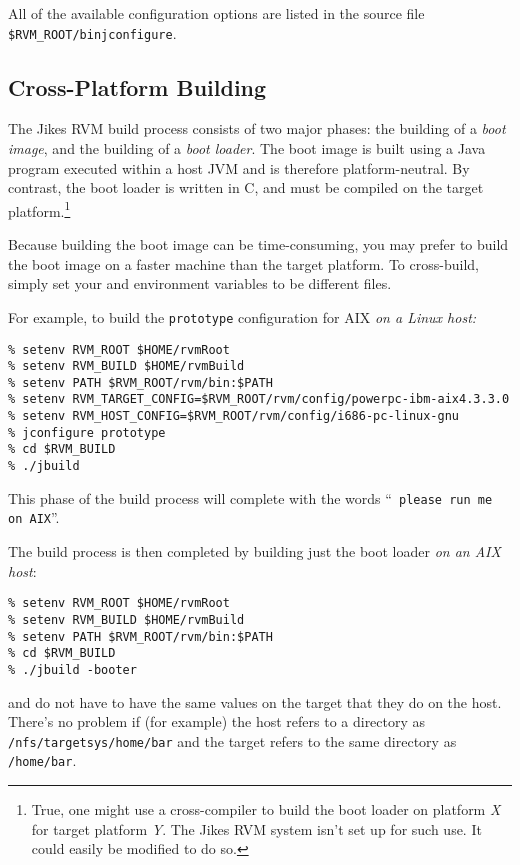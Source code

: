 All of the available configuration options are listed in the source
file \texttt{\$RVM\_ROOT\-/bin\/\-j\-con\-fi\-gure}.

\subsection{Cross-Platform Building}\label{cross-platform-building}

The Jikes\TMweb{} RVM build process consists of two major phases:
the building of a 
{\em boot image}, and the building of a {\em boot loader}.
The boot image is built using a Java\TMweb{} program executed within a host
JVM and is therefore platform-neutral.  By contrast, the boot loader
is written in C, and must be compiled on the target
platform.\footnote{True, one might use a cross-compiler to build the
  boot loader on platform \textit{X} for target platform \textit{Y}.
  The Jikes RVM system isn't set up for such use.  It could easily be
  modified to do so.}

Because building the boot image can be time-consuming,
you may prefer to build the boot image
on a faster machine than the target platform.  To cross-build, simply
set your 
 and  environment variables to
be different files.

For example, to build the \texttt{prototype} configuration for AIX\TMweb{} 
{\em on a Linux host:}
\begin{verbatim}
% setenv RVM_ROOT $HOME/rvmRoot
% setenv RVM_BUILD $HOME/rvmBuild
% setenv PATH $RVM_ROOT/rvm/bin:$PATH
% setenv RVM_TARGET_CONFIG=$RVM_ROOT/rvm/config/powerpc-ibm-aix4.3.3.0
% setenv RVM_HOST_CONFIG=$RVM_ROOT/rvm/config/i686-pc-linux-gnu
% jconfigure prototype
% cd $RVM_BUILD
% ./jbuild
\end{verbatim}

This phase of the build process will complete with the words ``{\tt
  please run me on AIX}''.


The build process is then completed by building just the boot loader {\em
  on an AIX host}:

\begin{verbatim}
% setenv RVM_ROOT $HOME/rvmRoot
% setenv RVM_BUILD $HOME/rvmBuild
% setenv PATH $RVM_ROOT/rvm/bin:$PATH
% cd $RVM_BUILD
% ./jbuild -booter
\end{verbatim}

 and  do not have to have the
same values on the target that they do on the host.   There's no
problem if (for example) the host refers to a directory as
\texttt{/nfs/\-tar\-get\-sys/\-home/\-bar} and the target refers to the same
directory as \texttt{/home/\-bar}.

